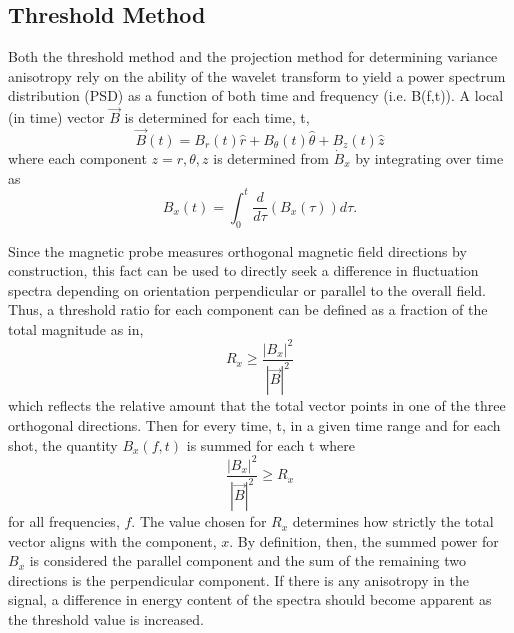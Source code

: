 \documentclass[aip,prl,amsmath,amssymb,reprint,superscriptaddress]{revtex4-1} %
\begin{document}
\subsection{Threshold Method}

Both the threshold method and the projection method for determining variance anisotropy rely on the ability of the wavelet transform to yield a power spectrum distribution (PSD) as a function of both time and frequency (i.e. B(f,t)). A local (in time) vector $\vec{B}$ is determined for each time, t,
\begin{equation}
\vec{B}(t) = B_{r}(t)\hat{r} + B_{\theta}(t)\hat{\theta} + B_{z}(t)\hat{z}
\label{eq:Bvector}
\end{equation}
where each component $z=r,\theta,z$ is determined from $\dot{B}_{x}$ by integrating over time as
\begin{equation}
B_{x}(t) = \int_{0}^{t} \frac{d}{d\tau}\left(B_{x}(\tau)\right) d\tau.
\label{eq:Bintegrated}
\end{equation}

Since the magnetic probe measures orthogonal magnetic field directions by construction, this fact can be used to directly seek a difference in fluctuation spectra depending on orientation perpendicular or parallel to the overall field. Thus, a threshold ratio for each component can be defined as a fraction of the total magnitude as in,
\begin{equation}
R_{x} \geq \frac{|B_{x}|^{2}}{|\vec{B}|^{2}}
\label{eq:Bthreshold}
\end{equation}
which reflects the relative amount that the total vector points in one of the three orthogonal directions. Then for every time, t, in a given time range and for each shot, the quantity $B_{x}(f,t)$ is summed for each t where
\begin{equation}
\frac{|B_{x}|^{2}}{|\vec{B}|^{2}} \geq R_{x}
\label{eq:Bcondition}
\end{equation}
for all frequencies, $f$. The value chosen for $R_{x}$ determines how strictly the total vector aligns with the component, $x$. By definition, then, the summed power for $B_{x}$ is considered the parallel component and the sum of the remaining two directions is the perpendicular component. If there is any anisotropy in the signal, a difference in energy content of the spectra should become apparent as the threshold value is increased.
\end{document}
